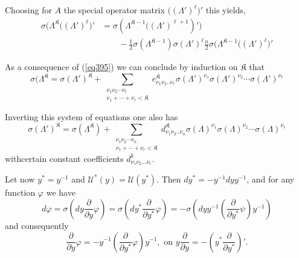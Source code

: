 Choosing for $A$ the special operator matrix $\big( (\Lambda')^\ell
\big)' $ this yields,  
\begin{align*}
\sigma (\Lambda^\mathfrak{K} \big( (\Lambda')^\ell \big)' & = \sigma
(\Lambda^{\mathfrak{K}-1} \big( (\Lambda')^{\ell+1})' \big) \\
& \qquad -
\frac{1}{2} \sigma (\Lambda^{\mathfrak{K}-1}) \sigma (\Lambda')^\ell
\frac{n}{2} \sigma (\Lambda^{\mathfrak{K}-1} \big( (\Lambda')^\ell
\big)' \tag{395}\label{eq395} 
\end{align*}

As a consequence of (\ref{eq395}) we can conclude by induction on
$\mathfrak{K}$ that  
\begin{equation*}
\sigma (\Lambda^\mathfrak{K} = \sigma (\Lambda')^\mathfrak{K} +
\sum_{\substack{\nu_1 \nu_2 \cdots \nu_r \\ \nu_1 + \cdots + \nu_r <
    \mathfrak{K}}} e^\mathfrak{K}_{\nu_1 \nu_2 .. \nu_r}
\sigma(\Lambda')^{\nu_s} \sigma(\Lambda')^{\nu_2} \cdots \sigma
(\Lambda')^{\nu_r} \tag{396}\label{eq396} 
\end{equation*}

Inverting this system of equations one also has 
\begin{equation*}
\sigma (\Lambda')^\mathfrak{K} = \sigma (\Lambda^\mathfrak{K}) +
\sum_{\substack{\nu_1 \nu_2 \cdots \nu_n \\ \nu_1 + \cdots + \nu_r <
    \mathfrak{K}}} d^\mathfrak{K}_{\nu_1 \nu_2 .. \nu_n} \sigma
(\Lambda)^{\nu_1} \sigma(\Lambda)^{\nu_2} \cdots
\sigma(\Lambda)^{\nu_r} \tag{397}\label{eq397} 
\end{equation*}
with\pageoriginale certain constant coefficients $d_{\nu_1 \nu_2
  \ldots \nu_r}^k$.  

Let\label{p.279} now $y^* = y^{-1}$ and $\mathcal{U}^* (y) = \mathcal{U} (y
^*)$. Then $dy^* = - y^{-1} d y y^{-1}$, and for any function
$\varphi$ we have  
$$
d \varphi = \sigma (dy \frac{\partial}{\partial y} \varphi) = \sigma
(d y^* \frac{\partial}{\partial y^*} \varphi ) = - \sigma (dy y^{-1}
(\frac{\partial}{\partial y^ *} \psi ) y^{-1}) 
$$
and consequently
$$
\frac{\partial}{\partial y} \varphi = - y^{-1}
(\frac{\partial}{\partial y^*} \varphi ) y^{-1}, \text { on } y
\frac{\partial}{\partial y} = - (y^* \frac{\partial}{\partial y^*})'. 
$$

